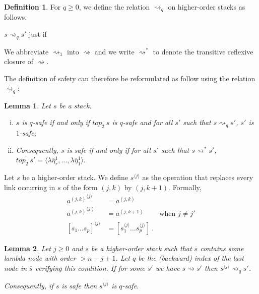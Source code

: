 \documentclass{article}
\newcommand{\ord}{\mathop{\mathrm{ord}}}
\newcommand{\prefixof}{\leqslant}
\newtheorem{lemma}{Lemma}[section]
\theoremstyle{remark}
\theoremstyle{definition}
\newtheorem{definition}{Definition}[section]
\newcommand\orddec\overline
\newcommand\saferel\rightsquigarrow
\begin{document}
\begin{definition}
For $q\geq 0$, we define the relation $\saferel_q$ on higher-order
stacks as follows.

$s \saferel_q s'$ just if
\begin{itemize}
\item $\orddec{top_2\ s} = \langle \lambda \overline{\eta}_r^1, \ldots , \lambda
\overline{\eta}_q^1, \lambda \overline{\eta}_{q-1}^{k_{q-1}}, \ldots
, \lambda \overline{\eta}_1^{k_1} \rangle$ ;

\item $s' = collapse (s_{\prefixof \lambda \overline{\eta}_i^1})$ for some $i$ in
$\{1..q\}$ such that $n - \ord{\lambda \overline{\eta}_i}} + 1 < \ord{s}$.
\end{itemize}

We abbreviate $\saferel_1$ into $\saferel$ and we write $\saferel^*$ to denote the transitive reflexive closure of $\saferel$.

\end{definition}
The definition of safety can therefore be reformulated as follow using the relation $\saferel_q$:
\begin{lemma} Let $s$ be a stack.
\begin{enumerate}[i.]
  \item $s$ is $q$-safe if and only if $top_2\ s$ is $q$-safe and for all $s'$ such that $s \saferel_q s'$, $s'$ is $1$-safe;

  \item Consequently, $s$ is safe if and only if for all $s'$ such that $s
  \saferel^*
s'$, $\orddec{top_2\ s'} = \langle \lambda \overline{\eta}_r^1,
\ldots , \lambda \overline{\eta}_1^{1} \rangle$.
\end{enumerate}
\end{lemma}

Let $s$ be a higher-order stack. We define $s^{\langle j \rangle}$ as the operation that replaces
every link occurring in $s$ of the form $(j,k)$ by $(j,k+1)$. Formally,
\begin{align*} 
{a^{(j,k)}}^{\langle j \rangle} &= a^{(j,k)}   \\
{a^{(j,k)}}^{\langle j' \rangle} &= a^{(j,k+1)} &   \mbox{when $j\neq j'$}\\
[s_1 \ldots s_p]^{\langle j \rangle} &= [s_1^{\langle j \rangle} \ldots s_p^{\langle j \rangle}] \ .
\end{align*}

\begin{lemma} Let $j\geq0$ and $s$ be a higher-order stack 
such that $\orddec{s}$ contains some lambda node with order $>n-j+1$. Let $q$ be the (backward) index of the last
 node in $\orddec{s}$ verifying this condition. If for some $s'$ we have $s \saferel s'$ then $s^{\langle j \rangle} \saferel_q s'$.

Consequently, if $s$ is safe then $s^{\langle j \rangle}$ is $q$-safe.
\end{lemma}
\end{document}

